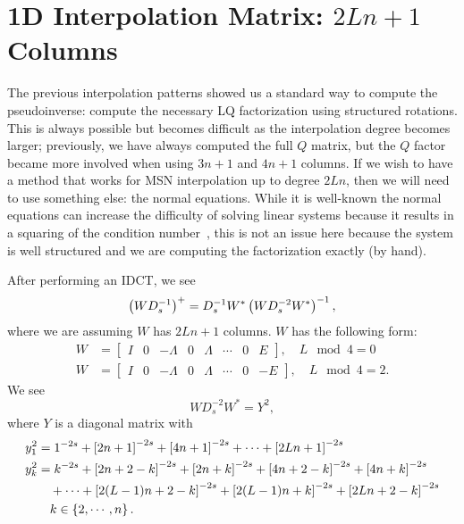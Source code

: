 \section{1D \CV{} Interpolation Matrix: $2Ln+1$ Columns}
\label{sec:CV_1D_2Ln}

The previous interpolation patterns showed us a standard way to 
compute the pseudoinverse: compute the necessary LQ factorization
using structured rotations.
This is always possible but becomes difficult as the interpolation
degree becomes larger; previously, we have always computed
the full $Q$ matrix, but the $Q$ factor became more involved when
using $3n+1$ and $4n+1$ columns.
If we wish to have a method that works for MSN interpolation up to degree
$2Ln$, then we will need to use something else: the normal equations.
While it is well-known the normal equations can increase
the difficulty of solving linear systems because it results
in a squaring of the condition number~\cite{gvl4,HighamASNA},
this is not an issue here because the system is well structured and
we are computing the factorization exactly (by hand).

After performing an IDCT, we see
%
\begin{equation}
    \left( WD_{s}^{-1} \right)^{+} = D_{s}^{-1}W^{*}
        \left( WD_{s}^{-2}W^{*} \right)^{-1},
\end{equation}
%
where we are assuming $W$ has $2Ln+1$ columns.
$W$ has the following form:
%
\begin{align}
    W &= \begin{bmatrix}
        I & 0 & -\Lambda & 0 & \Lambda & \cdots & 0 & E \end{bmatrix},
    \quad L \mod 4 = 0 \nonumber\\
    W &= \begin{bmatrix}
        I & 0 & -\Lambda & 0 & \Lambda & \cdots & 0 & -E \end{bmatrix},
    \quad L \mod 4 = 2.
\end{align}
%
We see
%
\begin{equation}
    WD_{s}^{-2}W^{*} = Y^{2},
\end{equation}
%
where $Y$ is a diagonal matrix with
%
\begin{align}
    y_{1}^{2} &= 1^{-2s} + \left[ 2n+1 \right]^{-2s} + \left[ 4n+1 \right]^{-2s}
        + \cdots + \left[ 2Ln+1 \right]^{-2s}
        \nonumber\\
    y_{k}^{2} &= k^{-2s} + \left[ 2n+2-k \right]^{-2s} + \left[ 2n+k \right]^{-2s}
        + \left[ 4n+2-k \right]^{-2s} + \left[ 4n+k \right]^{-2s} \nonumber\\
        &\quad+ \cdots
        + \left[ 2(L-1)n+2-k \right]^{-2s} + \left[ 2(L-1)n+k \right]^{-2s}
        + \left[ 2Ln+2-k \right]^{-2s} \nonumber\\
    &\quad k\in\left\{ 2,\cdots,n \right\}.
\end{align}

